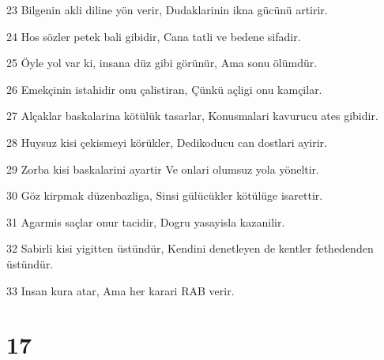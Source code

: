 \par 23 Bilgenin akli diline yön verir, Dudaklarinin ikna gücünü artirir.
\par 24 Hos sözler petek bali gibidir, Cana tatli ve bedene sifadir.
\par 25 Öyle yol var ki, insana düz gibi görünür, Ama sonu ölümdür.
\par 26 Emekçinin istahidir onu çalistiran, Çünkü açligi onu kamçilar.
\par 27 Alçaklar baskalarina kötülük tasarlar, Konusmalari kavurucu ates gibidir.
\par 28 Huysuz kisi çekismeyi körükler, Dedikoducu can dostlari ayirir.
\par 29 Zorba kisi baskalarini ayartir Ve onlari olumsuz yola yöneltir.
\par 30 Göz kirpmak düzenbazliga, Sinsi gülücükler kötülüge isarettir.
\par 31 Agarmis saçlar onur tacidir, Dogru yasayisla kazanilir.
\par 32 Sabirli kisi yigitten üstündür, Kendini denetleyen de kentler fethedenden üstündür.
\par 33 Insan kura atar, Ama her karari RAB verir.

\chapter{17}

